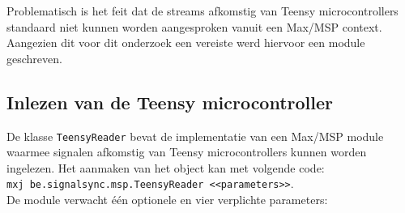 Problematisch is het feit dat de streams afkomstig van Teensy microcontrollers standaard niet kunnen worden aangesproken vanuit een Max/MSP context. Aangezien dit voor dit onderzoek een vereiste werd hiervoor een module geschreven.

\subsection{Inlezen van de Teensy microcontroller}
\label{teensy-reader}

De klasse \texttt{TeensyReader} bevat de implementatie van een Max/MSP module waarmee signalen afkomstig van Teensy microcontrollers kunnen worden ingelezen. Het aanmaken van het object kan met volgende code:\\
\mbox{\texttt{mxj\textapprox\ be.signalsync.msp.TeensyReader <<parameters>>}}.\\De module verwacht één optionele en vier verplichte parameters:

